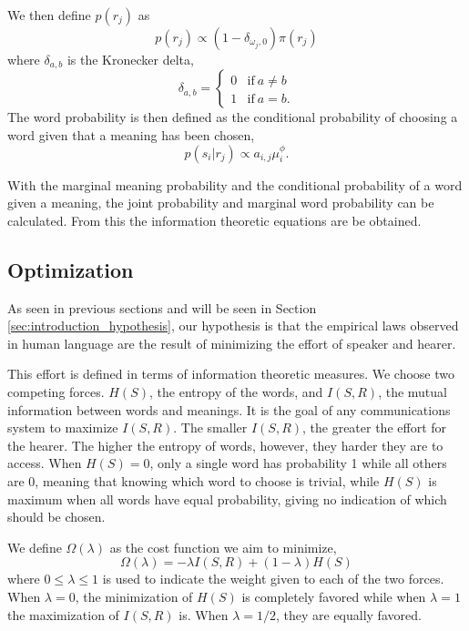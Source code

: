 We then define $p(r_j)$ as
\begin{equation}
  \label{eq:prj-proportional-pirj}
  p(r_j) \propto (1 - \delta_{\omega_j,0}) \pi(r_j)
\end{equation}
where $\delta_{a,b}$ is the Kronecker delta,
\begin{equation*}
  \delta_{a,b} = \begin{cases}
    0 & \text{if}~a \neq b \\
    1 & \text{if}~a = b.
  \end{cases}
\end{equation*}
The word probability is then defined as the conditional probability of choosing a word given that a meaning has been chosen,
\begin{equation}
  \label{eq:prop-cond-prob_second-model}
  p(s_i | r_j) \propto a_{i,j} \mu_i^\phi.
\end{equation}

With the marginal meaning probability and the conditional probability of a word given a meaning, the joint probability and marginal word probability can be calculated.
From this the information theoretic equations are be obtained.

\subsection{Optimization}
\label{sec:introduction_model_optimization}

As seen in previous sections and will be seen in Section \ref{sec:introduction_hypothesis}, our hypothesis is that the empirical laws observed in human language are the result of minimizing the effort of speaker and hearer.

This effort is defined in terms of information theoretic measures.
We choose two competing forces.
$H(S)$, the entropy of the words, and $I(S,R)$, the mutual information between words and meanings.
It is the goal of any communications system to maximize $I(S,R)$. The smaller $I(S,R)$, the greater the effort for the hearer.
The higher the entropy of words, however, they harder they are to access.
When $H(S)=0$, only a single word has probability 1 while all others are 0, meaning that knowing which word to choose is trivial, while $H(S)$ is maximum when all words have equal probability, giving no indication of which should be chosen.

We define $\Omega(\lambda)$ as the cost function we aim to minimize,
\begin{equation}
  \label{eq:definition-Omega}
  \Omega(\lambda) = -\lambda I(S,R) + (1 - \lambda) H(S)
\end{equation}
where $0 \leq \lambda \leq 1$ is used to indicate the weight given to each of the two forces.
When $\lambda=0$, the minimization of $H(S)$ is completely favored while when $\lambda=1$ the maximization of $I(S,R)$ is.
When $\lambda=1/2$, they are equally favored.


